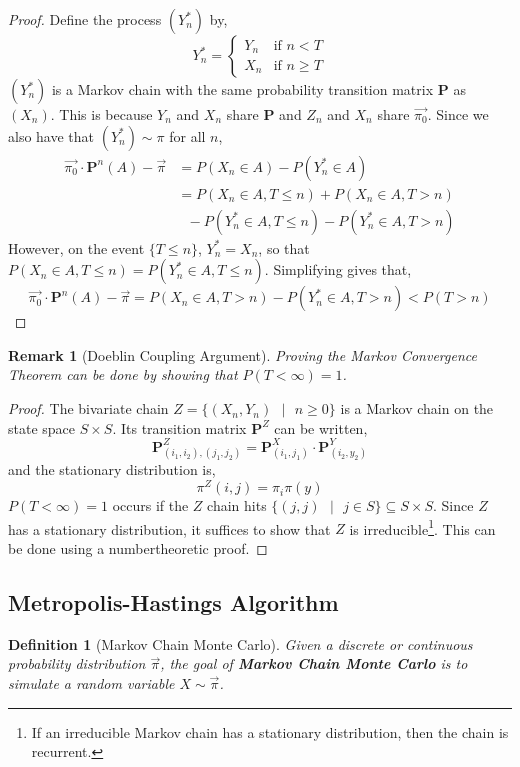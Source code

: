 \documentclass{tufte-handout}
\newtheorem{defn}[thm]{Definition}
\newtheorem{rmk}[thm]{Remark}
\begin{document}
  \begin{proof}
    Define the process $(Y_n^*)$ by,
    \[
    Y_n^* = \begin{cases}
      Y_n & \text{if $n < T$} \\
      X_n & \text{if $n \geq T$}
    \end{cases}
    \]
    \noindent $(Y_n^*)$ is a Markov chain with the same probability transition matrix \textbf{P} as $(X_n)$. This is because $Y_n$ and $X_n$ share \textbf{P} and $Z_n$ and $X_n$ share $\Vec{\pi_0}$. Since we also have that $(Y_n^*) \sim \pi$ for all $n$, 
    \begin{align*}
      \Vec{\pi_0} \cdot \boldsymbol{P}^n(A) - \Vec{\pi} &= P(X_n \in A) - P(Y_n^* \in A) \\
                                             &= P(X_n \in A, T \leq n) + P(X_n \in A, T > n) \\
                                             &\text{  } - P(Y_n^* \in A, T \leq n) - P(Y_n^* \in A, T > n)
    \end{align*}
    \noindent However, on the event $\{T \leq n\}$, $Y_n^* = X_n$, so that $P(X_n \in A, T \leq n) = P(Y_n^* \in A, T \leq n)$. Simplifying gives that,
    \[\Vec{\pi_0} \cdot \boldsymbol{P}^n(A) - \Vec{\pi} = P(X_n \in A, T > n) - P(Y_n^* \in A, T > n) < P(T > n)\]
  \end{proof}

  \begin{rmk}[Doeblin Coupling Argument]
    Proving the Markov Convergence Theorem can be done by showing that $P(T < \infty) = 1$.
  \end{rmk}

  \begin{proof}
    The bivariate chain $Z = \{(X_n, Y_n) \text{ $|$ } n \geq 0\}$ is a Markov chain on the state space $S \times S$. Its transition matrix $\boldsymbol{P}^Z$ can be written,
    \[\boldsymbol{P}^Z_{(i_1, i_2), (j_1, j_2)} = \boldsymbol{P}^X_{(i_1, j_1)}\cdot\boldsymbol{P}^Y_{(i_2, y_2)}\]
    \noindent and the stationary distribution is,
    \[\pi^Z(i,j) = \pi_i\pi(y)\]
    \noindent $P(T < \infty) = 1$ occurs if the $Z$ chain hits $\{(j,j) \text{ $|$ } j \in S\} \subseteq S \times S$. Since $Z$ has a stationary distribution, it suffices to show that $Z$ is irreducible\footnote{If an irreducible Markov chain has a stationary distribution, then the chain is recurrent.}. This can be done using a numbertheoretic proof.
  \end{proof}

  \subsection{Metropolis-Hastings Algorithm}
  \begin{defn}[Markov Chain Monte Carlo]
    Given a discrete or continuous probability distribution $\Vec{\pi}$, the goal of \textbf{Markov Chain Monte Carlo} is to simulate a random variable $X \sim \Vec{\pi}$.
  \end{defn}
\end{document}
